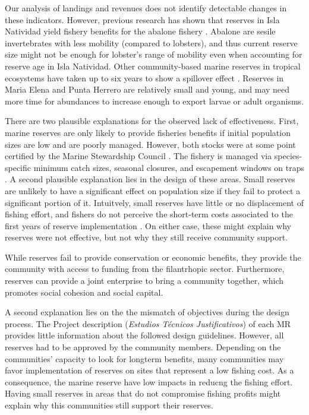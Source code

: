 \documentclass{frontiersSCNS}
\theoremstyle{definition}
\theoremstyle{definition}
\theoremstyle{definition}
\theoremstyle{remark}
\begin{document}
Our analysis of landings and revenues does not identify detectable
changes in these indicators. However, previous research has shown that
reserves in Isla Natividad yield fishery benefits for the abalone
fishery \citep{rossetto_2015-V0}. Abalone are sesile invertebrates with
less mobility (compared to lobsters), and thus current reserve size
might not be enough for lobster's range of mobility even when accounting
for reserve age in Isla Natividad. Other community-based marine reserves
in tropical ecosystems have taken up to six years to show a spillover
effect \citep{dasilva_2015-zX}. Reserves in Maria Elena and Punta
Herrero are relatively small and young, and may need more time for
abundances to increase enough to export larvae or adult organisms.

There are two plausible explanations for the observed lack of
effectiveness. First, marine reserves are only likely to provide
fisheries benefits if initial population sizes are low
\citep{hilborn_2006} and are poorly managed. However, both stocks were
at some point certified by the Marine Stewardship Council
\citep{prezramrez_2016-J1}. The fishery is managed via species-specific
minimum catch sizes, seasonal closures, and escapement windows on traps
\cite{dof_website_1993}. A second plausible explanation lies in the
design of these areas. Small reserves are unlikely to have a significant
effect on population size if they fail to protect a significant portion
of it. Intuitvely, small reserves have little or no displacement of
fishing effort, and fishers do not perceive the short-term costs
associated to the first years of reserve implementation
\citep{ovando_2016-Wg}. On either case, these might explain why reserves
were not effective, but not why they still receive community support.

While reserves fail to provide conservation or economic benefits, they
provide the community with access to funding from the filantrhopic
sector. Furthermore, reserves can provide a joint enterprise to bring a
community together, which promotes social cohesion and social capital.

A second explanation lies on the the mismatch of objectives during the
design process. The Project description (\emph{Estudios Técnicos
Justificativos}) of each MR provides little information about the
followed design guidelines. However, all reserves had to be approved by
the community members. Depending on the communities' capacity to look
for longterm benefits, many communities may favor implementation of
reserves on sites that represent a low fishing cost. As a consequence,
the marine reserve have low impacts in reducng the fishing effort.
Having small reserves in areas that do not compromise fishing profits
might explain why this communities still support their reserves.
\end{document}
